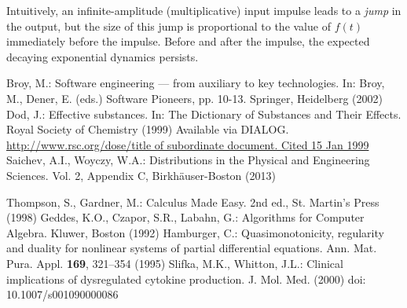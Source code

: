 \begin{svgraybox}

  Intuitively, an infinite-amplitude (multiplicative) input impulse leads to a \textit{jump} in the output, but the size of this jump is proportional to the value of \(f(t)\) immediately before the impulse. Before and after the impulse, the expected decaying exponential dynamics persists.
\end{svgraybox}	
 








\begin{thebibliography}{99.}%
 Broy, M.: Software engineering --- from auxiliary to key technologies. In: Broy, M., Dener, E. (eds.) Software Pioneers, pp. 10-13. Springer, Heidelberg (2002)
%
 Dod, J.: Effective substances. In: The Dictionary of Substances and Their Effects. Royal Society of Chemistry (1999) Available via DIALOG. \\
\url{http://www.rsc.org/dose/title of subordinate document. Cited 15 Jan 1999}
%
 Saichev, A.I., Woyczy, W.A.: Distributions in the Physical and Engineering Sciences. Vol. 2, Appendix C, Birkhäuser-Boston (2013) 

 Thompson, S., Gardner, M.: Calculus Made Easy. 2nd ed., St. Martin's Press (1998) 
%
 Geddes, K.O., Czapor, S.R., Labahn, G.: Algorithms for Computer Algebra. Kluwer, Boston (1992) 
%
 Hamburger, C.: Quasimonotonicity, regularity and duality for nonlinear systems of partial differential equations. Ann. Mat. Pura. Appl. \textbf{169}, 321--354 (1995)
%
 Slifka, M.K., Whitton, J.L.: Clinical implications of dysregulated cytokine production. J. Mol. Med. (2000) doi: 10.1007/s001090000086 

\end{thebibliography}